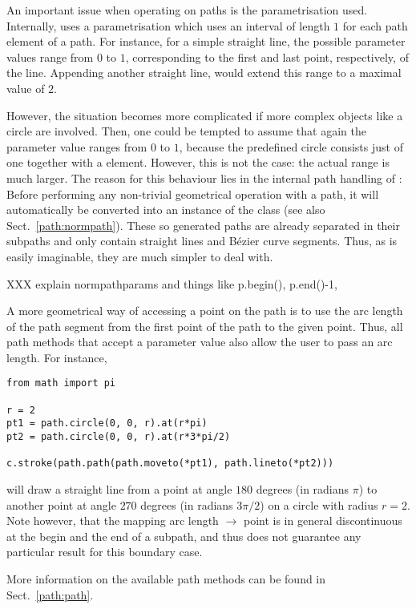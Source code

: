 An important issue when operating on paths is the parametrisation
used. Internally, \PyX{} uses a parametrisation which uses an interval
of length $1$ for each path element of a path. For instance, for a
simple straight line, the possible parameter values range from $0$ to
$1$, corresponding to the first and last point, respectively, of the
line. Appending another straight line, would extend this range to a
maximal value of $2$. 

However, the situation becomes more complicated if more complex
objects like a circle are involved. Then, one could be tempted to
assume that again the parameter value ranges from $0$ to $1$, because
the predefined circle consists just of one  together with a
 element. However, this is not the case: the actual
range is much larger. The reason for this behaviour lies in the
internal path handling of \PyX: Before performing any non-trivial
geometrical operation with a path, it will automatically be converted
into an instance of the  class (see also
Sect.~\ref{path:normpath}). These so generated paths are already
separated in their subpaths and only contain straight lines and
B\'ezier curve segments. Thus, as is easily imaginable, they are much
simpler to deal with.

XXX explain normpathparams and things like p.begin(), p.end()-1,

A more geometrical way of accessing a point on the path is to use the
arc length of the path segment from the first point of the path to the
given point. Thus, all \PyX{} path methods that accept a parameter
value also allow the user to pass an arc length. For instance,
\begin{verbatim}
from math import pi

r = 2
pt1 = path.circle(0, 0, r).at(r*pi)
pt2 = path.circle(0, 0, r).at(r*3*pi/2)

c.stroke(path.path(path.moveto(*pt1), path.lineto(*pt2)))
\end{verbatim}
will draw a straight line from a point at angle $180$ degrees (in
radians $\pi$) to another point at angle $270$ degrees (in radians
$3\pi/2$) on a circle with radius $r=2$. Note however, that the mapping arc
length $\to$ point is in general discontinuous at the begin and the
end of a subpath, and thus \PyX{} does not guarantee any particular
result for this boundary case.

More information on the available path methods can be found 
in Sect.~\ref{path:path}. 

